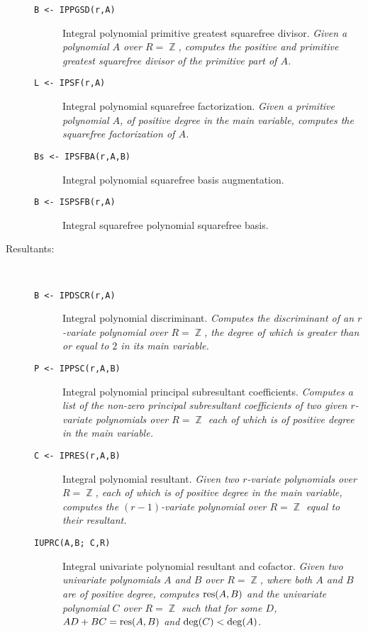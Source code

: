 \begin{description}
\begin{description}
    \item[{\tt B <- IPPGSD(r,A) 
}] Integral polynomial primitive greatest squarefree
divisor. {\em Given a polynomial $A$ over $R = \BbbZ$, computes the
positive and primitive greatest squarefree divisor of the primitive
part of $A$.}

    \item[{\tt L <- IPSF(r,A) 
}] Integral polynomial squarefree factorization. {\em
Given a primitive polynomial $A$, of positive degree in the main
variable, computes the squarefree factorization of $A$.}

    \item[{\tt Bs <- IPSFBA(r,A,B) 
}] Integral polynomial squarefree basis augmentation.

    \item[{\tt B <- ISPSFB(r,A) 
}] Integral squarefree polynomial squarefree basis.

  \end{description}

\item[Resultants:] \ \
  \begin{description}

    \item[{\tt B <- IPDSCR(r,A) 
}] Integral polynomial discriminant. {\em Computes the
discriminant of an $r$-variate polynomial over $R = \BbbZ$, the degree
of which is greater than or equal to $2$ in its main variable.}

    \item[{\tt P <- IPPSC(r,A,B) 
}] Integral polynomial principal subresultant
coefficients. {\em Computes a list of the non-zero principal
subresultant coefficients of two given $r$-variate polynomials over $R
= \BbbZ$ each of which is of positive degree in the main variable.}

    \item[{\tt C <- IPRES(r,A,B) 
}] Integral polynomial resultant. {\em Given two
$r$-variate polynomials over $R = \BbbZ$, each of which is
of positive degree in the main variable, computes the $(r-1)$-variate
polynomial over $R = \BbbZ$ equal to their resultant.}

    \item[{\tt  IUPRC(A,B; C,R) 
}] Integral univariate polynomial resultant and
cofactor. {\em Given two univariate polynomials $A$ and $B$ over $R =
\BbbZ$, where both $A$ and $B$ are of positive degree, computes ${\rm
res}(A,B)$ and the univariate polynomial $C$ over $R = \BbbZ$ such
that for some $D$, $AD + BC = {\rm res}(A,B)$ and ${\rm deg}(C) < {\rm
deg}(A)$.}


\end{description}
\end{description}
